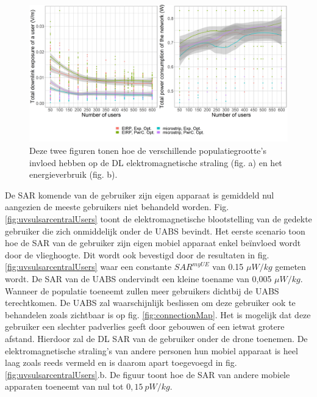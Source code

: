 \documentclass[twocolumn]{phdsymp_dutch}
\begin{document}
\begin{figure}[h!]
  \includegraphics[width=\linewidth]{../results/s2/uvsdlAndPc.png}
  \caption{Deze twee figuren tonen hoe de verschillende populatiegrootte's invloed hebben op de \acs{DL} elektromagnetische straling (fig. a) en het energieverbruik (fig. b).}
  \label{fig:s2b_dlAndPc}
\end{figure}

De \gls{SAR} komende van de gebruiker zijn eigen apparaat is gemiddeld nul aangezien de meeste gebruikers niet behandeld worden.
Fig. \ref{fig:uvsulsarcentralUsers} toont de elektromagnetische blootstelling van de gedekte gebruiker die zich onmiddelijk onder de \gls{UABS} bevindt.
Het eerste scenario toon hoe de \gls{SAR} van de gebruiker zijn eigen mobiel apparaat enkel be\"invloed wordt door de vlieghoogte.
Dit wordt ook bevestigd door de resultaten in fig. \ref{fig:uvsulsarcentralUsers} waar een constante 
$SAR^{myUE}$ van 0.15 $\mu W/kg$ gemeten wordt.
De \gls{SAR} van de  \gls{UABS} ondervindt een kleine toename van 0,005  $\mu W/kg$.
Wanneer de populatie toeneemt zullen meer gebruikers dichtbij de \gls{UABS} terechtkomen.
De \gls{UABS} zal waarschijnlijk beslissen om deze gebruiker ook te behandelen zoals zichtbaar is op fig. \ref{fig:connectionMap}.
Het is mogelijk dat deze gebruiker een slechter padverlies geeft door gebouwen of een ietwat grotere afstand. Hierdoor zal de
\gls{DL} \gls{SAR} van de gebruiker onder de drone toenemen.
De elektromagnetische straling's van andere personen hun mobiel apparaat is heel laag zoals 
reeds vermeld en is daarom apart toegevoegd in fig.  \ref{fig:uvsulsarcentralUsers}.b.
De figuur toont hoe de \gls{SAR} van andere mobiele apparaten toeneemt van nul tot $0,15\ pW/kg$.
\end{document}
